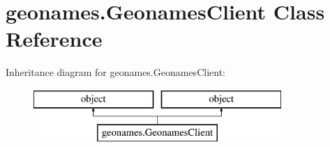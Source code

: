 \hypertarget{classgeonames_1_1GeonamesClient}{\section{geonames.\-Geonames\-Client Class Reference}
\label{classgeonames_1_1GeonamesClient}
}
Inheritance diagram for geonames.\-Geonames\-Client\-:\begin{figure}[H]
\begin{center}
\leavevmode
\includegraphics[height=2.000000cm]{classgeonames_1_1GeonamesClient}
\end{center}
\end{figure}
